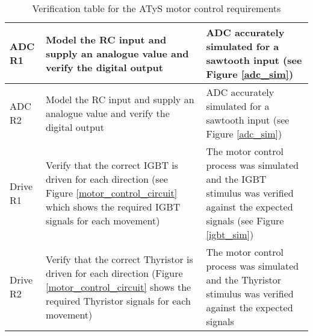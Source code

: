\begin{table}[tH]
\begin{tabular}{ |p{}|p{}|p{}| }
 \hline
 ADC R1 & Model the RC input and supply an analogue value and verify the digital output & ADC accurately simulated for a sawtooth input (see Figure \ref{adc_sim}) \\
 \hline
 ADC R2 & Model the RC input and supply an analogue value and verify the digital output & ADC accurately simulated for a sawtooth input (see Figure \ref{adc_sim})\\
 \hline
 Drive R1 & Verify that the correct IGBT is driven for each direction (see Figure \ref{motor_control_circuit} which shows the required IGBT signals for each movement) & The motor control process was simulated and the IGBT stimulus was verified against the expected signals (see Figure \ref{igbt_sim})\\
  \hline
 Drive R2 & Verify that the correct Thyristor is driven for each direction (Figure \ref{motor_control_circuit} shows the required Thyristor signals for each movement) & The motor control process was simulated and the Thyristor stimulus was verified against the expected signals \\
 \hline
\end{tabular}
\caption{Verification table for the ATyS motor control requirements}
\label{requirements-verification-table}
\end {table}